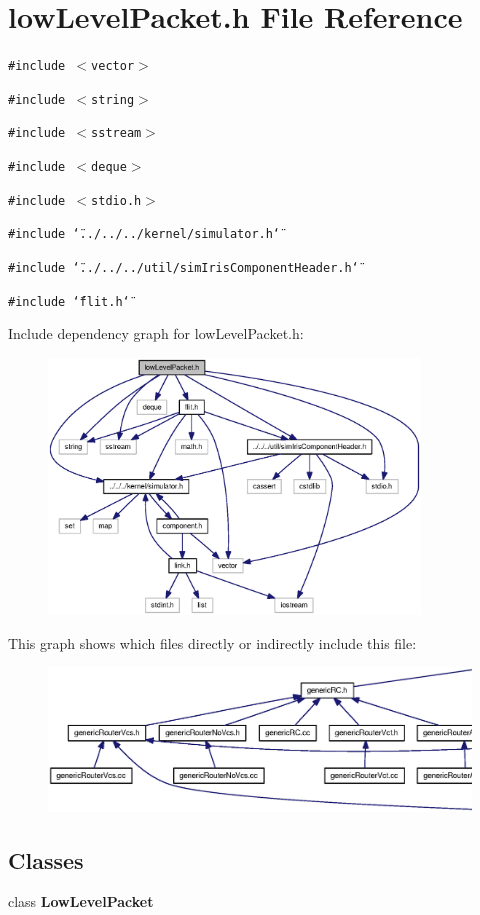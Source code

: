 \section{lowLevelPacket.h File Reference}
\label{lowLevelPacket_8h}
{\tt \#include $<$vector$>$}\par
{\tt \#include $<$string$>$}\par
{\tt \#include $<$sstream$>$}\par
{\tt \#include $<$deque$>$}\par
{\tt \#include $<$stdio.h$>$}\par
{\tt \#include \char`\"{}../../../kernel/simulator.h\char`\"{}}\par
{\tt \#include \char`\"{}../../../util/simIrisComponentHeader.h\char`\"{}}\par
{\tt \#include \char`\"{}flit.h\char`\"{}}\par


Include dependency graph for lowLevelPacket.h:\nopagebreak
\begin{figure}[H]
\begin{center}
\leavevmode
\includegraphics[width=280pt]{lowLevelPacket_8h__incl}
\end{center}
\end{figure}


This graph shows which files directly or indirectly include this file:\nopagebreak
\begin{figure}[H]
\begin{center}
\leavevmode
\includegraphics[width=420pt]{lowLevelPacket_8h__dep__incl}
\end{center}
\end{figure}
\subsection*{Classes}
\begin{CompactItemize}
\item 
class {\bf LowLevelPacket}
\end{CompactItemize}
